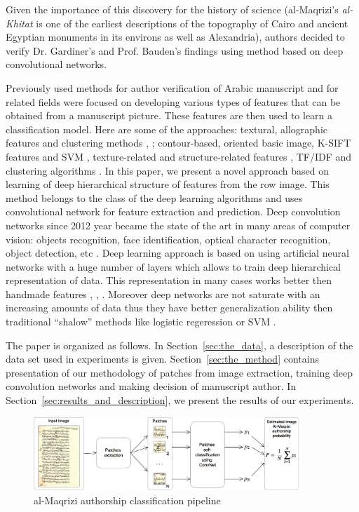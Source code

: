 \documentclass[conference,a4paper]{ieeetran}
\begin{document}
Given the importance of this discovery for the history of science (al-Maqrizi's \textit{al-Khitat} is one of the earliest descriptions of the topography of Cairo and ancient Egyptian monuments in its environs as well as Alexandria), authors decided to verify Dr. Gardiner's and Prof. Bauden's findings using method based on deep convolutional networks.

Previously used methods for author verification of Arabic manuscript and for related fields were focused on developing various types of features that can be obtained from a manuscript picture. These features are then used to learn a classification model. Here are some of the approaches: textural, allographic features and clustering methods \cite{MBulacu}, \cite{MBulacu1}; contour-based, oriented basic image, K-SIFT features and SVM \cite{DFecker}, texture-related and structure-related features \cite{Salvador}, TF/IDF and clustering algorithms \cite{Dunn}. In this paper, we present a novel approach based on learning of deep hierarchical structure of features from the row image. This method belongs to the class of the deep learning algorithms \cite{DL} and uses convolutional network \cite{CNN} for feature extraction and prediction. Deep convolution networks since 2012 year \cite{Alexnet} became the state of the art in many areas of computer vision: objects recognition, face identification, optical character recognition, object detection, etc \cite{DL}. Deep learning approach is based on using artificial neural networks with a huge number of layers which allows to train deep hierarchical representation of data. This representation in many cases works better then handmade features \cite{DL}, \cite{Alexnet}, \cite{Googlenet}. Moreover deep networks are not saturate with an increasing amounts of data thus they have better generalization ability then traditional ``shalow'' methods like logistic regeression or SVM \cite{DL}.   

The paper is organized as follows. In Section~\ref{sec:the_data}, a description of the data set used in experiments is given. Section~\ref{sec:the_method} contains presentation of our methodology of patches from image extraction, training deep convolution networks and making decision of manuscript author. In Section~\ref{sec:results_and_description}, we present the results of our experiments.
	

\begin{figure}[!t]
	\center
  \includegraphics[width=0.9\textwidth]{figures/Al-Maqrizi_classification_pipeline.png}
  \caption{al-Maqrizi authorship classification pipeline}
  \label{fig:pipeline}
\end{figure}	
	
\end{document}
